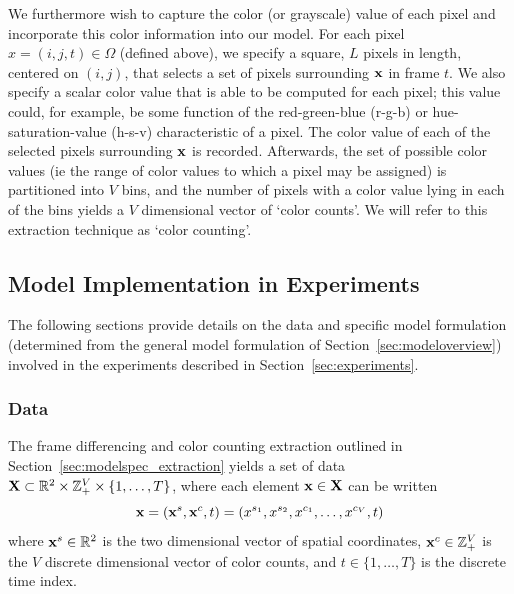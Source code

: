 \documentclass[twocolumn, final]{svjour3}
\begin{document}
We furthermore wish to capture the color (or grayscale) value of each pixel and incorporate this color information into our model. For each pixel $x = (i, j, t) \in \Omega$ (defined above), we specify a square, $L$ pixels in length, centered on $(i, j)$, that selects a set of pixels surrounding $\bold{x}$ in frame $t$. We also specify a scalar color value that is able to be computed for each pixel; this value could, for example, be some function of the red-green-blue (r-g-b) or hue-saturation-value (h-s-v) characteristic of a pixel. The color value of each of the selected pixels surrounding $\bold{x}$ is recorded. Afterwards, the set of possible color values (ie the range of color values to which a pixel may be assigned) is partitioned into $V$ bins, and the number of pixels with a color value lying in each of the bins yields a $V$ dimensional vector of `color counts'. We will refer to this extraction technique as `color counting'.







\subsection{Model Implementation in Experiments}

The following sections provide details on the data and specific model formulation (determined from the general model formulation of Section~\ref{sec:modeloverview}) involved in the experiments described in Section~\ref{sec:experiments}.






\subsubsection{Data}

The frame differencing and color counting extraction outlined in Section~\ref{sec:modelspec_extraction} yields a set of data $\bold{X} \subset \mathbb{R}^{2} \times \mathbb{Z}_{+}^{V} \times \{1, \ldots, T \}$, where each element $\bold{x} \in \bold{X}$ can be written
\begin{equation}
\bold{x} = ( \bold{x}^{s}, \bold{x}^{c}, t ) = ( x^{s_{1}}, x^{s_{2}}, x^{c_{1}}, \ldots, x^{c_{V}}, t )
\end{equation}
where $\bold{x}^{s} \in \mathbb{R}^{2}$ is the two dimensional vector of spatial coordinates,  $\bold{x}^{c} \in \mathbb{Z}_{+}^{V}$ is the $V$ discrete dimensional vector of color counts, and $t \in \{1, \ldots, T \}$ is the discrete time index. 
\end{document}
